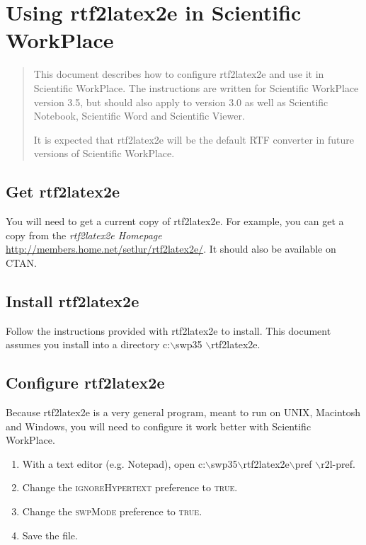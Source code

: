 \documentclass{article}
\newcommand{\TEXTsymbol}[1]{$#1$}
\begin{document}
\section{Using rtf2latex2e in Scientific WorkPlace}

\begin{quotation}
This document describes how to configure rtf2latex2e and use it in
Scientific WorkPlace. The instructions are written for Scientific WorkPlace
version 3.5, but should also apply to version 3.0 as well as Scientific
Notebook, Scientific Word and Scientific Viewer.

It is expected that rtf2latex2e will be the default RTF converter in future
versions of Scientific WorkPlace.
\end{quotation}

\subsection{Get rtf2latex2e}

You will need to get a current copy of rtf2latex2e. For example, you can get
a copy from the \textit{rtf2latex2e Homepage} \hyperref{%
http://members.home.net/setlur/rtf2latex2e/}{}{}{%
http://members.home.net/setlur/rtf2latex2e/}. It should also be available on
CTAN.

\subsection{Install rtf2latex2e}

Follow the instructions provided with rtf2latex2e to install. This document
assumes you install into a directory \textsf{c:\TEXTsymbol{\backslash}swp35%
\TEXTsymbol{\backslash}rtf2latex2e}.

\subsection{Configure rtf2latex2e}

Because rtf2latex2e is a very general program, meant to run on UNIX,
Macintosh and Windows, you will need to configure it work better with
Scientific WorkPlace.

\begin{enumerate}
\item With a text editor (e.g. Notepad), open \textsf{c:\TEXTsymbol{%
\backslash}swp35\TEXTsymbol{\backslash}rtf2latex2e\TEXTsymbol{\backslash}pref%
\TEXTsymbol{\backslash}r2l-pref}.

\item Change the \textsc{ignoreHypertext} preference to \textsc{true}.

\item Change the \textsc{swpMode} preference to \textsc{true}.

\item Save the file.
\end{enumerate}
\end{document}

